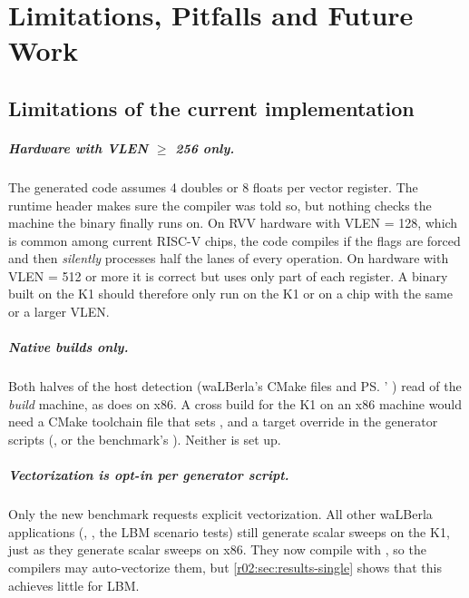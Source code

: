 \chapter{Limitations, Pitfalls and Future Work}\label{r02:ch:limitations}

\section{Limitations of the current implementation}\label{r02:sec:limitations}

\paragraph{Hardware with VLEN $\geq$ 256 only.}\label{r02:sec:lim-vlen}
The generated code assumes 4 doubles or 8 floats per vector register. The runtime header
makes sure the compiler was told so, but nothing checks the machine the binary finally
runs on. On RVV hardware with VLEN = 128, which is common among current RISC-V chips,
the code compiles if the flags are forced and then \emph{silently} processes half the
lanes of every operation. On hardware with VLEN = 512 or more it is correct but uses
only part of each register. A binary built on the K1 should therefore only run on the
K1 or on a chip with the same or a larger VLEN.

\paragraph{Native builds only.}
Both halves of the host detection (waLBerla's CMake files and \ps{}'
) read  of the \emph{build} machine, as
 does on x86. A cross build for the K1 on an x86 machine would need
a CMake toolchain file that sets , and a target override in
the generator scripts (, or the
benchmark's ). Neither is set up.

\paragraph{Vectorization is opt-in per generator script.}
Only the new benchmark requests explicit vectorization. All other waLBerla applications
(, , the LBM scenario tests) still generate
scalar sweeps on the K1, just as they generate scalar sweeps on x86. They now compile
with , so the compilers may auto-vectorize them, but
\cref{r02:sec:results-single} shows that this achieves little for LBM.

